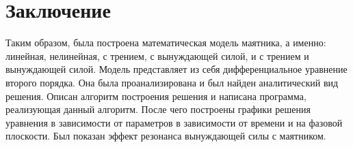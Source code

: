 \section{Заключение}
    Таким образом, была построена математическая модель маятника, а именно: линейная, нелинейная, с трением, с вынуждающей силой, и с трением и вынуждающей силой. Модель представляет из себя дифференциальное уравнение второго порядка. Она была проанализирована и был найден аналитический вид решения. Описан алгоритм построения решения и написана программа, реализующая данный алгоритм. После чего построены графики решения уравнения в зависимости от параметров в зависимости от времени и на фазовой плоскости. Был показан эффект резонанса вынуждающей силы с маятником.
